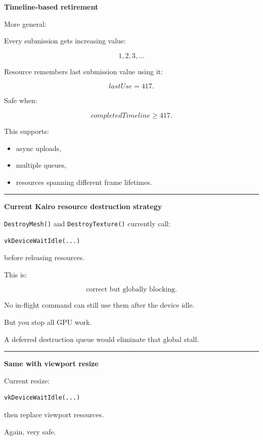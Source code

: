 \textbf{Timeline-based retirement}

More general:

Every submission gets increasing value:

\[
1,2,3,\dots
\]

Resource remembers last submission value using it:

\[
lastUse=417.
\]

Safe when:

\[
completedTimeline\ge417.
\]

This supports:

\begin{itemize}
\tightlist
\item
  async uploads,
\item
  multiple queues,
\item
  resources spanning different frame lifetimes.
\end{itemize}

\begin{center}\rule{0.5\linewidth}{0.5pt}\end{center}

\textbf{Current Kairo resource destruction strategy}

\texttt{DestroyMesh()} and \texttt{DestroyTexture()} currently call:

\begin{verbatim}
vkDeviceWaitIdle(...)
\end{verbatim}

before releasing resources.

This is:

\[
\boxed{\text{correct but globally blocking}.}
\]

No in-flight command can still use them after the device idle.

But you stop all GPU work.

A deferred destruction queue would eliminate that global stall.

\begin{center}\rule{0.5\linewidth}{0.5pt}\end{center}

\textbf{Same with viewport resize}

Current resize:

\begin{verbatim}
vkDeviceWaitIdle(...)
\end{verbatim}

then replace viewport resources.

Again, very safe.

